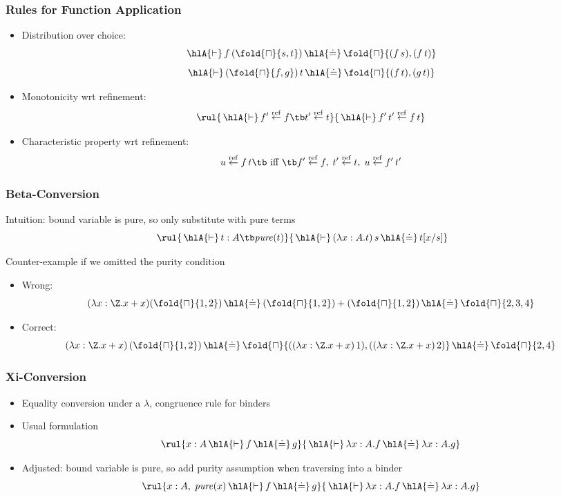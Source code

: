 \documentclass{beamer}
\def\choice#1{\fold{\sqcap}{#1}}
\def\pure#1{\mathit{pure}(#1)}
\def\refine#1#2{#1\stackrel{\mathrm{ref}}{\leftarrow}#2}
\def\refine#1#2{#1\stackrel{\mathrm{ref}}{\leftarrow}#2}
\def\der{\,\hlA{\vdash}\,}
\def\syneq{\,\hlA{\doteq}\,}
\begin{document}
\begin{frame}\frametitle{Rules for Function Application}
\begin{itemize}
\item Distribution over choice:
\[\der f\,(\choice{s,t}) \syneq \choice{(f\,s),(f\,t)}\]
\[\der (\choice{f,g})\,t \syneq \choice{(f\,t),(g\,t)}\]
\item Monotonicity wrt refinement:
\[\rul{\der \refine{f'}{f} \tb \refine{t'}{t}}{\der\refine{f'\,t'}{f\,t}}\]
\item Characteristic property wrt refinement:
 \[\refine{u}{f\,t} \tb\text{ iff }\tb \refine{f'}{f},\;\refine{t'}{t},\; \refine{u}{f'\,t'}\]
\end{itemize}

\end{frame}


\begin{frame}\frametitle{Beta-Conversion}
Intuition: bound variable is pure, so only substitute with pure terms
\[\rul{\der t:A \tb \pure{t}}{\der (\lambda x:A.t)\,s \syneq t[x/s]}\]

Counter-example if we omitted the purity condition
\begin{itemize}
\item Wrong:
\[(\lambda x:\Z.x+x)(\choice{1,2})\syneq (\choice{1,2})+(\choice{1,2})\syneq\choice{2,3,4}\]
\item Correct:
\[(\lambda x:\Z.x+x)\,(\choice{1,2})\syneq \choice{((\lambda x:\Z.x+x)\,1),((\lambda x:\Z.x+x)\,2)}\syneq\choice{2,4}\]
\end{itemize}
\end{frame}

\begin{frame}\frametitle{Xi-Conversion}
\begin{itemize}
\item Equality conversion under a $\lambda$, congruence rule for binders
\item Usual formulation
\[\rul{x:A\der f\syneq g}{\der \lambda x:A.f\syneq \lambda x:A.g}\]
\item Adjusted: bound variable is pure, so add purity assumption when traversing into a binder
\[\rul{x:A,\;\pure{x}\der f\syneq g}{\der \lambda x:A.f\syneq \lambda x:A.g}\]
\end{itemize}
\end{frame}
\end{document}
